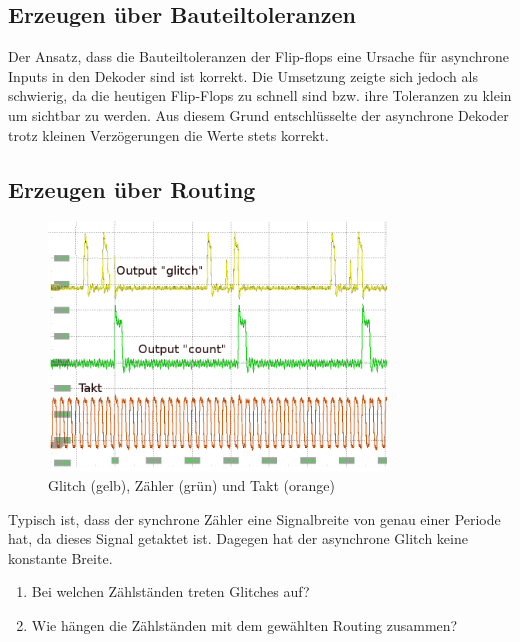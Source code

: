 \subsection{Erzeugen über Bauteiltoleranzen}
Der Ansatz, dass die Bauteiltoleranzen der Flip-flops eine Ursache für asynchrone Inputs in den Dekoder sind ist korrekt. Die Umsetzung zeigte sich jedoch als schwierig, da die heutigen Flip-Flops zu schnell sind bzw. ihre Toleranzen zu klein um sichtbar zu werden.  Aus diesem Grund entschlüsselte der asynchrone Dekoder trotz kleinen Verzögerungen die Werte stets korrekt.\\



\subsection{Erzeugen über Routing} 
\begin{figure}[H]
	\centering
	\includegraphics[width=0.8\textwidth]{images/glitch/Glitch_2_good_kommentar.png}
	\caption{Glitch (gelb), Zähler (grün) und Takt (orange)}
	\label{fig.glitch.result_1}
\end{figure}

Typisch ist, dass der synchrone Zähler eine Signalbreite von genau einer Periode hat, da dieses Signal getaktet ist. Dagegen hat der asynchrone Glitch keine konstante Breite.
\begin{enumerate}
	\item{Bei welchen Zählständen treten Glitches auf?}

	\item{Wie hängen die Zählständen mit dem gewählten Routing zusammen?}

\end{enumerate}
